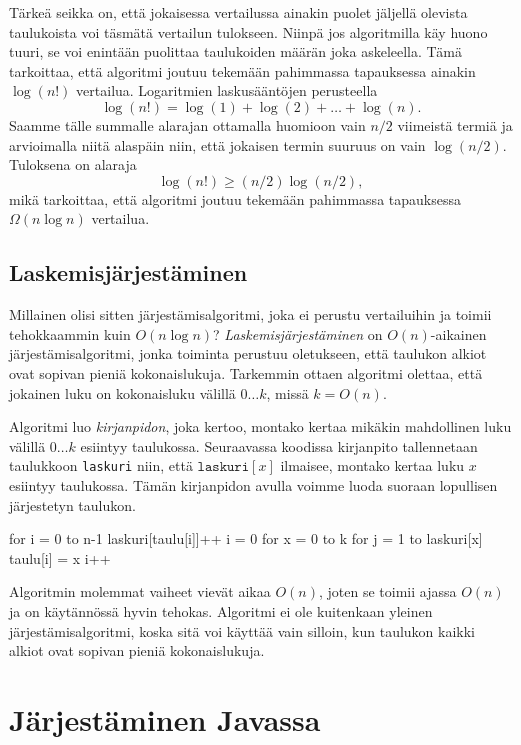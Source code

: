 Tärkeä seikka on, että jokaisessa vertailussa ainakin puolet jäljellä
olevista taulukoista voi täsmätä vertailun tulokseen.
Niinpä jos algoritmilla käy huono tuuri, se voi enintään puolittaa
taulukoiden määrän joka askeleella.
Tämä tarkoittaa, että algoritmi joutuu tekemään pahimmassa
tapauksessa ainakin $\log(n!)$ vertailua.
Logaritmien laskusääntöjen perusteella
\[
\log(n!) = \log(1)+\log(2)+\dots+\log(n).
\]
Saamme tälle summalle alarajan ottamalla huomioon vain
$n/2$ viimeistä termiä ja arvioimalla niitä alaspäin niin, 
että jokaisen termin suuruus on vain $\log(n/2)$. Tuloksena on alaraja
\[
\log(n!) \ge (n/2) \log(n/2),
\]
mikä tarkoittaa, että algoritmi joutuu tekemään
pahimmassa tapauksessa $\Omega(n \log n)$ vertailua.

\subsection{Laskemisjärjestäminen}


Millainen olisi sitten järjestämisalgoritmi,
joka ei perustu vertailuihin ja toimii
tehokkaammin kuin $O(n \log n)$?
\emph{Laskemisjärjestäminen} on $O(n)$-aikainen järjestämisalgoritmi,
jonka toiminta perustuu oletukseen, että taulukon alkiot
ovat sopivan pieniä kokonaislukuja.
Tarkemmin ottaen algoritmi olettaa, että jokainen luku on
kokonaisluku välillä $0 \dots k$, missä $k=O(n)$.

Algoritmi luo \emph{kirjanpidon}, joka kertoo,
montako kertaa mikä\-kin mahdollinen luku välillä $0 \dots k$
esiintyy taulukossa.
Seuraavassa koodissa kirjanpito tallennetaan
taulukkoon \texttt{laskuri} niin, että
$\texttt{laskuri}[x]$ ilmaisee,
montako kertaa luku $x$ esiintyy taulukossa.
Tämän kirjanpidon avulla voimme luoda suoraan
lopullisen järjestetyn taulukon.

\begin{code}
for i = 0 to n-1
    laskuri[taulu[i]]++
i = 0
for x = 0 to k
    for j = 1 to laskuri[x]
        taulu[i] = x
        i++
\end{code}

Algoritmin molemmat vaiheet vievät aikaa $O(n)$,
joten se toimii ajassa $O(n)$ ja on käytännössä hyvin tehokas.
Algoritmi ei ole kuitenkaan yleinen järjestämisalgoritmi,
koska sitä voi käyttää vain silloin,
kun taulukon kaikki alkiot ovat sopivan pieniä kokonaislukuja.


\section{Järjestäminen Javassa}

